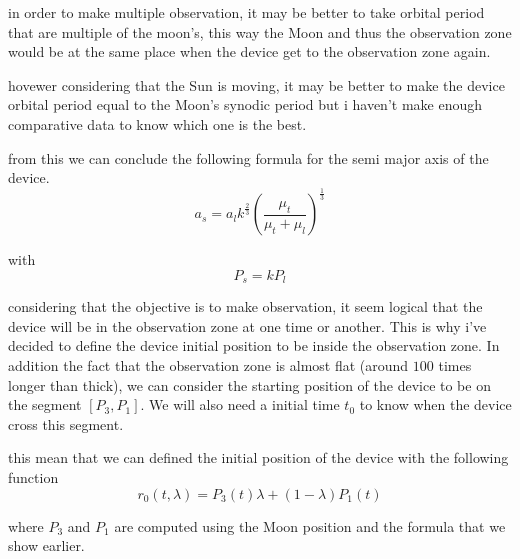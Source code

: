 \documentclass[11pt]{article} %
\begin{document}
		
		
		
		
		in order to make multiple observation, it may be better to take orbital period that are multiple of the moon's, this way the Moon and thus the observation zone would be at the same place when the device get to the observation zone again.
		
		hovewer considering that the Sun is moving, it may be better to make the device orbital period equal to the Moon's synodic period but i haven't make enough comparative data to know which one is the best.	
		
		from this we can conclude the following formula for the semi major axis of the device.
		$$
		a_s=a_lk^{\frac{2}{3}}\left(\frac{\mu_t}{\mu_t+\mu_l}\right)^\frac{1}{3}
		$$
		
		with
		$$
		P_s=kP_l
		$$
		
		considering that the objective is to make observation, it seem logical that the device will be in the observation zone at one time or another. This is why i've decided to define the device initial position to be inside the observation zone. In addition the fact that the observation zone is almost flat (around $100$ times longer than thick), we can consider the starting position of the device to be on the segment $[P_3,P_1]$. We will also need a initial time $t_0$ to know when the device cross this segment.
		
		this mean that we can defined the initial position of the device with the following function
		$$
		r_0(t,\lambda)=P_3(t)\lambda+(1-\lambda)P_1(t)
		$$
		
		where $P_3$ and $P_1$ are computed using the Moon position and the formula that we show earlier.
		
		
		
		
		
\end{document}
